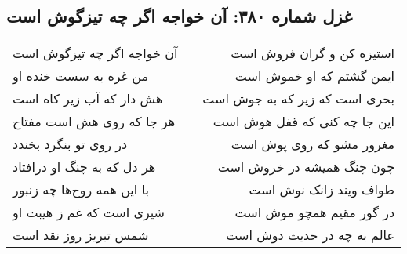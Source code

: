 \begin{center}
\section*{غزل شماره ۳۸۰: آن خواجه اگر چه تیزگوش است}
\label{sec:0380}
\begin{longtable}{l p{0.5cm} r}
آن خواجه اگر چه تیزگوش است
&&
استیزه کن و گران فروش است
\\
من غره به سست خنده او
&&
ایمن گشتم که او خموش است
\\
هش دار که آب زیر کاه است
&&
بحری است که زیر که به جوش است
\\
هر جا که روی هش است مفتاح
&&
این جا چه کنی که قفل هوش است
\\
در روی تو بنگرد بخندد
&&
مغرور مشو که روی پوش است
\\
هر دل که به چنگ او درافتاد
&&
چون چنگ همیشه در خروش است
\\
با این همه روح‌ها چه زنبور
&&
طواف ویند زانک نوش است
\\
شیری است که غم ز هیبت او
&&
در گور مقیم همچو موش است
\\
شمس تبریز روز نقد است
&&
عالم به چه در حدیث دوش است
\\
\end{longtable}
\end{center}
